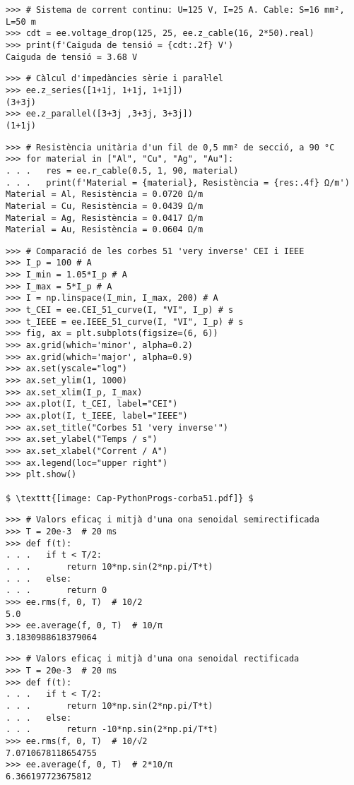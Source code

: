 \begin{lstlisting}
>>> # Sistema de corrent continu: U=125 V, I=25 A. Cable: S=16 mm², L=50 m
>>> cdt = ee.voltage_drop(125, 25, ee.z_cable(16, 2*50).real)
>>> print(f'Caiguda de tensió = {cdt:.2f} V')
Caiguda de tensió = 3.68 V
\end{lstlisting}

	
\begin{lstlisting}
>>> # Càlcul d'impedàncies sèrie i paraŀlel
>>> ee.z_series([1+1j, 1+1j, 1+1j])
(3+3j)
>>> ee.z_parallel([3+3j ,3+3j, 3+3j])
(1+1j)
\end{lstlisting}

\begin{lstlisting}
>>> # Resistència unitària d'un fil de 0,5 mm² de secció, a 90 °C 
>>> for material in ["Al", "Cu", "Ag", "Au"]:
. . .   res = ee.r_cable(0.5, 1, 90, material)
. . .   print(f'Material = {material}, Resistència = {res:.4f} Ω/m')
Material = Al, Resistència = 0.0720 Ω/m
Material = Cu, Resistència = 0.0439 Ω/m
Material = Ag, Resistència = 0.0417 Ω/m
Material = Au, Resistència = 0.0604 Ω/m        
\end{lstlisting}

\begin{lstlisting}[mathescape=true]
>>> # Comparació de les corbes 51 'very inverse' CEI i IEEE
>>> I_p = 100 # A
>>> I_min = 1.05*I_p # A
>>> I_max = 5*I_p # A
>>> I = np.linspace(I_min, I_max, 200) # A
>>> t_CEI = ee.CEI_51_curve(I, "VI", I_p) # s   
>>> t_IEEE = ee.IEEE_51_curve(I, "VI", I_p) # s      
>>> fig, ax = plt.subplots(figsize=(6, 6))
>>> ax.grid(which='minor', alpha=0.2)
>>> ax.grid(which='major', alpha=0.9)
>>> ax.set(yscale="log")
>>> ax.set_ylim(1, 1000)
>>> ax.set_xlim(I_p, I_max)
>>> ax.plot(I, t_CEI, label="CEI")
>>> ax.plot(I, t_IEEE, label="IEEE")
>>> ax.set_title("Corbes 51 'very inverse'")
>>> ax.set_ylabel("Temps / s")
>>> ax.set_xlabel("Corrent / A")
>>> ax.legend(loc="upper right")
>>> plt.show()

$ \texttt{[image: Cap-PythonProgs-corba51.pdf]} $
\end{lstlisting}

\begin{lstlisting}
>>> # Valors eficaç i mitjà d'una ona senoidal semirectificada
>>> T = 20e-3  # 20 ms
>>> def f(t):
. . .   if t < T/2:
. . .       return 10*np.sin(2*np.pi/T*t)
. . .   else:
. . .       return 0
>>> ee.rms(f, 0, T)  # 10/2
5.0
>>> ee.average(f, 0, T)  # 10/π
3.1830988618379064
\end{lstlisting}

\begin{lstlisting}
>>> # Valors eficaç i mitjà d'una ona senoidal rectificada
>>> T = 20e-3  # 20 ms
>>> def f(t):
. . .   if t < T/2:
. . .       return 10*np.sin(2*np.pi/T*t)
. . .   else:
. . .       return -10*np.sin(2*np.pi/T*t)
>>> ee.rms(f, 0, T)  # 10/√2
7.0710678118654755
>>> ee.average(f, 0, T)  # 2*10/π
6.366197723675812
\end{lstlisting}



